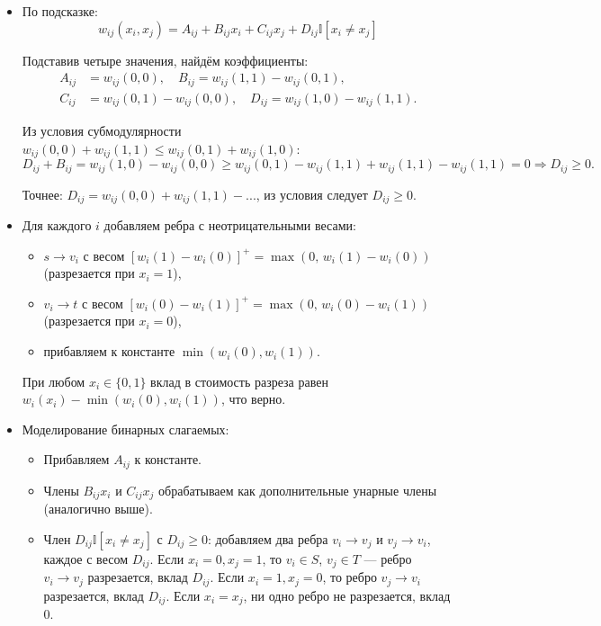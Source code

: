 \begin{enumerate}
\begin{itemize}
      \item По подсказке:
      $$w_{ij}(x_i, x_j) = A_{ij} + B_{ij} x_i + C_{ij} x_j + D_{ij} \mathbb{I}[x_i \ne x_j]$$
      
      Подставив четыре значения, найдём коэффициенты:
      \begin{align*}
        A_{ij} &= w_{ij}(0,0), \quad
        B_{ij} = w_{ij}(1,1) - w_{ij}(0,1), \\
        C_{ij} &= w_{ij}(0,1) - w_{ij}(0,0), \quad
        D_{ij} = w_{ij}(1,0) - w_{ij}(1,1).
      \end{align*}
      
      Из условия субмодулярности $w_{ij}(0,0)+w_{ij}(1,1) \le w_{ij}(0,1)+w_{ij}(1,0)$:
      $$D_{ij} + B_{ij} = w_{ij}(1,0) - w_{ij}(0,0) \ge w_{ij}(0,1) - w_{ij}(1,1) + w_{ij}(1,1) - w_{ij}(1,1) = 0 \Rightarrow D_{ij} \ge 0.$$
      
      Точнее: $D_{ij} = w_{ij}(0,0)+w_{ij}(1,1) - ... $, из условия следует $D_{ij} \ge 0$.

      \item Для каждого $i$ добавляем ребра с неотрицательными весами:
      \begin{itemize}
        \item $s \to v_i$ с весом $[w_i(1) - w_i(0)]^+ = \max(0,\, w_i(1) - w_i(0))$ (разрезается при $x_i = 1$),
        \item $v_i \to t$ с весом $[w_i(0) - w_i(1)]^+ = \max(0,\, w_i(0) - w_i(1))$ (разрезается при $x_i = 0$),
        \item прибавляем к константе $\min(w_i(0), w_i(1))$.
      \end{itemize}
      При любом $x_i \in \{0,1\}$ вклад в стоимость разреза равен $w_i(x_i) - \min(w_i(0), w_i(1))$, что верно.

      \item Моделирование бинарных слагаемых:
      \begin{itemize}
        \item Прибавляем $A_{ij}$ к константе.
        \item Члены $B_{ij} x_i$ и $C_{ij} x_j$ обрабатываем как дополнительные унарные члены (аналогично выше).
        \item Член $D_{ij} \mathbb{I}[x_i \ne x_j]$ с $D_{ij} \ge 0$: добавляем два ребра $v_i \to v_j$ и $v_j \to v_i$, каждое с весом $D_{ij}$.
        Если $x_i = 0, x_j = 1$, то $v_i \in S$, $v_j \in T$ --- ребро $v_i \to v_j$ разрезается, вклад $D_{ij}$.
        Если $x_i = 1, x_j = 0$, то ребро $v_j \to v_i$ разрезается, вклад $D_{ij}$.
        Если $x_i = x_j$, ни одно ребро не разрезается, вклад $0$.
      \end{itemize}


\end{itemize}
\end{enumerate}
